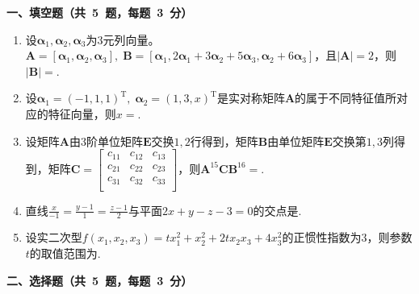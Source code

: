 \documentclass[11pt,a4paper]{ctexart}
\def\t{^\mathrm{T}}
\begin{document}
\begin{framed}



    \begin{large}	

    \begin{large}
			\noindent\textbf{一、填空题（共~5~题，每题~3~分）}
	\end{large}        
	\begin{enumerate}
        \item 设\(\boldsymbol{\alpha}_1, \boldsymbol{\alpha}_2, \boldsymbol{\alpha}_3\)为\(3\)元列向量。\(\boldsymbol{A} = [\boldsymbol{\alpha}_1, \boldsymbol{\alpha}_2 , \boldsymbol{\alpha}_3],\; \boldsymbol{B} = [\boldsymbol{\alpha}_1, 2\boldsymbol{\alpha}_1 + 3 \boldsymbol{\alpha}_2 + 5\boldsymbol{\alpha}_3 , \boldsymbol{\alpha}_2 + 6 \boldsymbol{\alpha}_3]\)，且\(|\boldsymbol{A}| = 2\)，则\(|\boldsymbol{B}| = \)\tk{}.

        \item 设\(\boldsymbol{\alpha}_1 = (-1, 1, 1)\t,\; \boldsymbol{\alpha}_2 =  (1, 3, x)\t\)是实对称矩阵\(\boldsymbol{A}\)的属于不同特征值所对应的特征向量，则\(x = \)\tk{}.
        
        \item 设矩阵\(\boldsymbol{A}\)由\(3\)阶单位矩阵\(\boldsymbol{E}\)交换\(1 , 2\)行得到，矩阵\(\boldsymbol{B}\)由单位矩阵\(\boldsymbol{E}\)交换第\(1, 3\)列得到，矩阵\(\boldsymbol{C} = \displaystyle \begin{bmatrix}
            c_{11} & c_{12} & c_{13} \\ 
            c_{21} & c_{22} & c_{23} \\ 
            c_{31} & c_{32} & c_{33} \\ 
        \end{bmatrix}\)，则\(\boldsymbol{A}^{15} \boldsymbol{C} \boldsymbol{B}^{16} = \)\tk{}.

        \item 直线\(\displaystyle \frac{x}{-1} = \frac{y - 1}{1} = \frac{z - 1}{2}\)与平面\(2x + y - z - 3 = 0\)的交点是\tk{}.
        \item 设实二次型\(f(x_1, x_2, x_3) = tx_1^2 + x_2^2 + 2tx_2x_3 + 4x_3^2\)的正惯性指数为\(3\)，则参数\(t\)的取值范围为\tk{}.

	\end{enumerate} 

    \vspace{4mm} \noindent \textbf{二、选择题（共~5~题，每题~3~分）}
	\end{large}
    \begin{enumerate}
        

\end{enumerate}
\end{framed}
\end{document}
